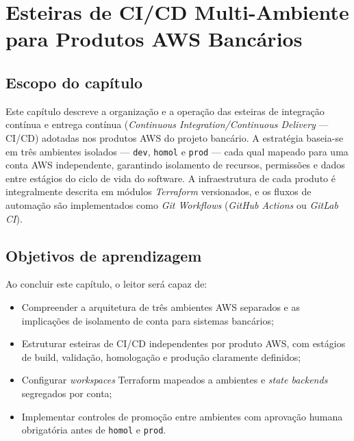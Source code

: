 \chapter{Esteiras de CI/CD Multi-Ambiente para Produtos AWS Banc\'arios}
\label{chap:cicd_multiambiente_bancario}

\section{Escopo do cap\'itulo}

Este cap\'itulo descreve a organiza\c{c}\~ao e a opera\c{c}\~ao das
esteiras de integra\c{c}\~ao cont\'inua e entrega cont\'inua
(\textit{Continuous Integration/Continuous Delivery} --- CI/CD) adotadas
nos produtos AWS do projeto bancário. A estratégia baseia-se em
tr\^es ambientes isolados --- \texttt{dev},
\texttt{homol} e \texttt{prod} ---
cada qual mapeado para uma conta AWS independente,
garantindo isolamento de recursos, permiss\~oes e dados entre est\'agios do
ciclo de vida do software. A infraestrutura de cada produto \'e integralmente
descrita em m\'odulos \textit{Terraform} versionados, e os
fluxos de automa\c{c}\~ao s\~ao implementados como
\textit{Git Workflows}
(\textit{GitHub Actions} ou \textit{GitLab CI}).

\section{Objetivos de aprendizagem}

Ao concluir este cap\'itulo, o leitor ser\'a capaz de:

\begin{itemize}[leftmargin=*]
  \item Compreender a arquitetura de tr\^es ambientes AWS separados e
        as implica\c{c}\~oes de isolamento de conta para sistemas banc\'arios;
  \item Estruturar esteiras de CI/CD independentes por produto AWS,
        com est\'agios de build, valida\c{c}\~ao, homologa\c{c}\~ao e
        produ\c{c}\~ao claramente definidos;
  \item Configurar \textit{workspaces} Terraform
        mapeados a ambientes e \textit{state backends}
        segregados por conta;
  \item Implementar controles de promo\c{c}\~ao entre ambientes com
        aprova\c{c}\~ao humana obrigat\'oria antes de \texttt{homol}
        e \texttt{prod}.
\end{itemize}


